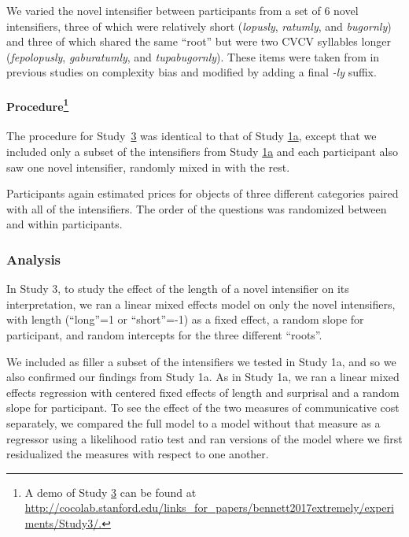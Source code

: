 \documentclass[10pt,letterpaper]{article}
\newcommand{\w}[1]{\emph{#1}}
\begin{document}
We varied the novel intensifier between participants from a set of 6 novel intensifiers, three of which were relatively short (\w{lopusly}, \w{ratumly}, and \w{bugornly}) and three of which shared the same ``root'' but were two CVCV syllables longer (\w{fepolopusly}, \w{gaburatumly}, and \w{tupabugornly}).
These items were taken from in previous studies on complexity bias \cite{lewis_conceptual_2016} and modified by adding a final \w{-ly} suffix.

\paragraph{Procedure\footnote{A demo of Study \hyperref[sec:study3]{3} can be found at \url{http://cocolab.stanford.edu/links_for_papers/bennett2017extremely/experiments/Study3/.}}}

The procedure for Study~\hyperref[sec:study3]{3} was identical to that of Study \hyperref[sec:study1a]{1a}, except that we included only a subset of the intensifiers from Study \hyperref[sec:study1a]{1a} and each participant also saw one novel intensifier, randomly mixed in with the rest.

Participants again estimated prices for objects of three different categories paired with all of the intensifiers.
The order of the questions was randomized between and within participants.

\subsubsection{Analysis}

In Study 3,  to study the effect of the length of a novel intensifier on its interpretation, we ran a linear mixed effects model on only the novel intensifiers, with length (``long''=1 or ``short''=-1) as a fixed effect, a random slope for participant, and random intercepts for the three different ``roots''.

We included as filler a subset of the intensifiers we tested in Study 1a, and so we also confirmed our findings from Study 1a.
As in Study 1a, we ran a linear mixed effects regression with centered fixed effects of length and surprisal and a random slope for participant.
%
To see the effect of the two measures of communicative cost separately, we compared the full model to a model without that measure as a regressor using a likelihood ratio test and ran versions of the model where we first residualized the measures with respect to one another.
\end{document}
